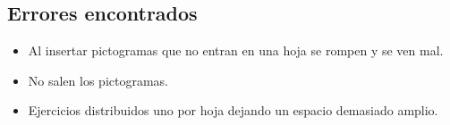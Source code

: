 \subsection{Errores encontrados}
\label{errores:mates}
\begin{itemize}
    \item Al insertar pictogramas que no entran en una hoja se rompen y se ven mal.
    \item No salen los pictogramas.
    \item Ejercicios distribuidos uno por hoja dejando un espacio demasiado amplio.
\end{itemize}
